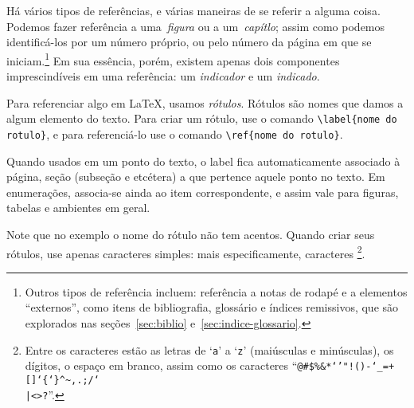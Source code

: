 Há vários tipos de referências, e várias maneiras de se referir a
alguma coisa. Podemos fazer referência a uma~\emph{figura} ou a
um~\emph{capítlo}; assim como podemos identificá-los por um número
próprio, ou pelo número da página em que se iniciam.\footnote{Outros
  tipos de referência incluem: referência a notas de rodapé e a
  elementos ``externos'', como itens de bibliografia, glossário e
  índices remissivos, que são explorados nas seções~\ref{sec:biblio} 
  e~\ref{sec:indice-glossario}.} Em sua essência, porém, existem
apenas dois componentes imprescindíveis em uma referência: um
\emph{indicador} e um \emph{indicado}.

Para referenciar algo em \LaTeX, usamos \emph{rótulos}. Rótulos são nomes que damos a algum elemento do texto. Para criar um rótulo, use o comando \verb'\label{nome do rotulo}', e para referenciá-lo use o comando \verb'\ref{nome do rotulo}'. 

Quando usados em um ponto do texto, o label fica automaticamente associado à página, seção (subseção e etcétera) a que pertence aquele ponto no texto. Em enumerações, associa-se ainda ao item correspondente, e assim vale para figuras, tabelas e ambientes em geral.

Note que no exemplo o nome do rótulo não tem acentos. Quando criar seus rótulos, use apenas caracteres simples: mais especificamente, caracteres  \footnote{Entre os caracteres  estão as letras de `\texttt{a}' a `\texttt{z}' (maiúsculas e minúsculas), os dígitos, o espaço em branco, assim como os caracteres ``\texttt{@\#\$\%\&*`'"!()-\char`\_=+[]\char`\{\char`\}\^{}\~{},.;/\char`\\|<>?}''.}.


